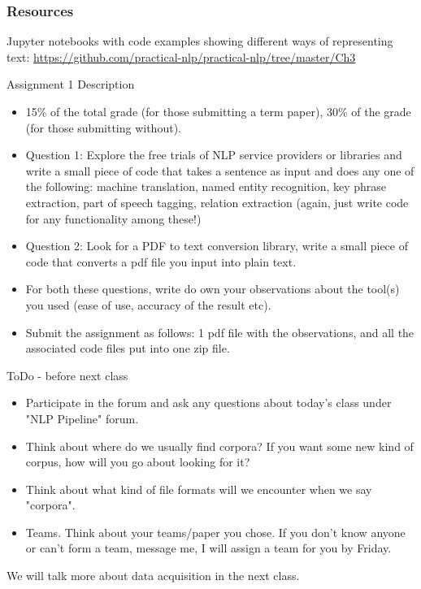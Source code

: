 \documentclass{beamer}
\begin{document}
\begin{frame}
\frametitle{Resources}
Jupyter notebooks with code examples showing different ways of representing text: \url{https://github.com/practical-nlp/practical-nlp/tree/master/Ch3}
\end{frame}

\begin{frame}{Assignment 1 Description}
    \begin{itemize}
        \item 15\% of the total grade (for those submitting a term paper), 30\% of the grade (for those submitting without).
\item Question 1: Explore the free trials of NLP service providers or libraries and write a small piece of code that takes a sentence as input and does any one of the following: machine translation, named entity recognition, key phrase extraction, part of speech tagging, relation extraction (again, just write code for any functionality among these!)

\item Question 2: Look for a PDF to text conversion library, write a small piece of code that converts a pdf file you input into plain text.

\item For both these questions, write do own your observations about the tool(s) you used (ease of use, accuracy of the result etc).

\item Submit the assignment as follows: 1 pdf file with the observations, and all the associated code files put into one zip file.
    \end{itemize}
\end{frame}

\begin{frame}{ToDo - before next class}
    \begin{itemize}
        \item Participate in the forum and ask any questions about today's class under "NLP Pipeline" forum. 
        \item Think about where do we usually find corpora? If you want some new kind of corpus, how will you go about looking for it?
        \item Think about what kind of file formats will we encounter when we say "corpora". 
        \item Teams. Think about your teams/paper you chose. If you don't know anyone or can't form a team, message me, I will assign a team for you by Friday.
    \end{itemize}
    We will talk more about data acquisition in the next class.
\end{frame}
\end{document}
